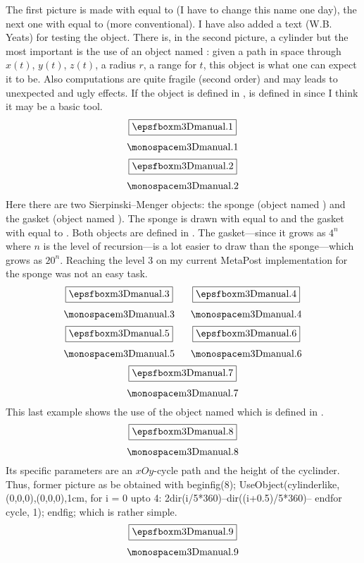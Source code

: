 The first picture is made with  equal to  (I
have to change this name one day), the next one with  equal
to  (more conventional). I have also added a text (W.B. Yeats)
for testing the  object. There is, in the second picture, a cylinder but the most
important is the use of an object named : given a path in
space through $x(t)$, $y(t)$, $z(t)$, a radius $r$, a range for $t$,
this object is what one can expect it to be. Also computations are
quite fragile (second order) and may leads to unexpected and ugly
effects. If the object  is defined in ,
 is defined in  since I think it may be a
basic tool.
$$\mybox{m3Dmanual.1}$$
$$\mybox{m3Dmanual.2}$$ Here there are two
Sierpinski--Menger objects: the sponge (object named
) and the gasket (object named
). The sponge is drawn with  equal to
 and the gasket with  equal to
. Both objects are defined in . The
gasket---since it grows as $4^n$ where $n$ is the level of
recursion---is a lot easier to draw than the sponge---which grows as
$20^n$. Reaching the level 3 on my current MetaPost implementation for
the sponge was not an easy task.
$$\mybox{m3Dmanual.3}\qquad\mybox{m3Dmanual.4}$$
$$\mybox{m3Dmanual.5}\qquad\mybox{m3Dmanual.6}$$
$$
	\mybox{m3Dmanual.7}
$$
This last example shows the use of the object named 
which is defined in .
$$
	\mybox{m3Dmanual.8}
$$
Its specific parameters are an
$xOy$-cycle path and the height of the cyclinder. Thus, former picture
as be obtained with
\verbatim
	beginfig(8);
		UseObject(cylinderlike,(0,0,0),(0,0,0),1cm,
			for i = 0 upto 4:
				2dir(i/5*360)--dir((i+0.5)/5*360)--
			endfor cycle, 1);
	endfig;
\endverbatim
\noindent which is rather simple.
$$
	\mybox{m3Dmanual.9}
$$
\bye

